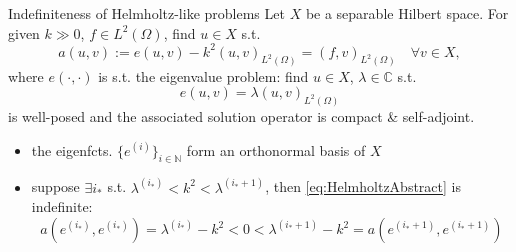 \documentclass[11pt,aspectratio=169,xcolor=dvipsnames]{beamer}
\newcommand{\ei}{e^{(i)}}
\newcommand{\nicearrow}[2]{\raisebox{#2}{\resizebox{0.45cm}{!}{\color{#1}{\MVRightArrow}\color{black}}}}
\begin{document}
\begin{frame}{Indefiniteness of Helmholtz-like problems}
  Let $X$ be a separable Hilbert space. For given $k \gg 0$, $f \in L^2(\Omega)$, find $u \in X$ s.t. 
  \begin{equation}\label{eq:HelmholtzAbstract}
    a(u,v) := e(u,v) - k^2(u,v)_{L^2(\Omega)} = (f,v)_{L^2(\Omega)} \quad \forall v \in X, \tag{P}
  \end{equation}
  where $e(\cdot,\cdot)$ is s.t. the eigenvalue problem: find $u \in X$, $\lambda \in \mathbb{C}$ s.t. 
  \begin{equation*}
    e(u,v) = \lambda (u,v)_{L^2(\Omega)}
  \end{equation*}
  is well-posed and the associated solution operator is compact \& self-adjoint. 
  \begin{itemize}
    \item<2->[\nicearrow{GOE}{-0.07cm}] the eigenfcts. $\{ \ei \}_{i \in \mathbb{N}}$ form an orthonormal basis of $X$
    \item<3->[\nicearrow{GOE}{-0.07cm}] suppose $\exists i_{\ast}$ s.t. $\lambda^{(i_{\ast})} < k^2 < \lambda^{(i_{\ast} + 1)}$, then \eqref{eq:HelmholtzAbstract} is indefinite: 
    \begin{equation*}
      a(e^{(i_{\ast})},e^{(i_{\ast})}) = \lambda^{(i_{\ast})} - k^2 < 0 <  \lambda^{(i_{\ast}+1)} - k^2 = a(e^{(i_{\ast} + 1)},e^{(i_{\ast} + 1)})
    \end{equation*}
  \end{itemize}
\end{frame}
\end{document}
